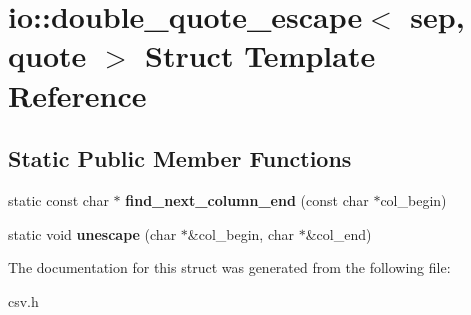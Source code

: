 \section{io\+:\+:double\+\_\+quote\+\_\+escape$<$ sep, quote $>$ Struct Template Reference}
\label{structio_1_1double__quote__escape}
\subsection*{Static Public Member Functions}
\begin{DoxyCompactItemize}
\item 
static const char $\ast$ {\bfseries find\+\_\+next\+\_\+column\+\_\+end} (const char $\ast$col\+\_\+begin)\label{structio_1_1double__quote__escape_a30070914039ca8a20f716fbf53d68c41}

\item 
static void {\bfseries unescape} (char $\ast$\&col\+\_\+begin, char $\ast$\&col\+\_\+end)\label{structio_1_1double__quote__escape_a02e332751916fbdb7b35c238d690e580}

\end{DoxyCompactItemize}


The documentation for this struct was generated from the following file\+:\begin{DoxyCompactItemize}
\item 
csv.\+h\end{DoxyCompactItemize}
